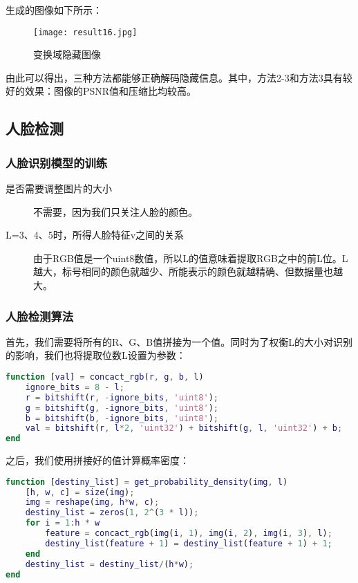 \documentclass[a4paper]{article}
\begin{document}
\par 生成的图像如下所示：

\begin{figure}[ht]
    \centering
    \texttt{[image: result16.jpg]}
    \caption{变换域隐藏图像}
    \label{fig:result 16}
\end{figure}

\par 由此可以得出，三种方法都能够正确解码隐藏信息。其中，方法2-3和方法3具有较好的效果：图像的PSNR值和压缩比均较高。

\subsection{人脸检测}

\subsubsection{人脸识别模型的训练}
\begin{description}
    \item [是否需要调整图片的大小]
    \par 不需要，因为我们只关注人脸的颜色。
    \item [L=3、4、5时，所得人脸特征v之间的关系]
    由于RGB值是一个uint8数值，所以L的值意味着提取RGB之中的前L位。L越大，标号相同的颜色就越少、所能表示的颜色就越精确、但数据量也越大。
    
\end{description}

\subsubsection{人脸检测算法}
\par 首先，我们需要将所有的R、G、B值拼接为一个值。同时为了权衡L的大小对识别的影响，我们也将提取位数L设置为参数：
\begin{lstlisting}[language=matlab, caption=RGB值的拼接]
function [val] = concact_rgb(r, g, b, l)    
    ignore_bits = 8 - l;
    r = bitshift(r, -ignore_bits, 'uint8');
    g = bitshift(g, -ignore_bits, 'uint8');
    b = bitshift(b, -ignore_bits, 'uint8');
    val = bitshift(r, l*2, 'uint32') + bitshift(g, l, 'uint32') + b;
end
\end{lstlisting}

\par 之后，我们使用拼接好的值计算概率密度：
\begin{lstlisting}[language=matlab, caption=概率密度计算]
function [destiny_list] = get_probability_density(img, l)
    [h, w, c] = size(img);
    img = reshape(img, h*w, c);
    destiny_list = zeros(1, 2^(3 * l));
    for i = 1:h * w
        feature = concact_rgb(img(i, 1), img(i, 2), img(i, 3), l); 
        destiny_list(feature + 1) = destiny_list(feature + 1) + 1;
    end
    destiny_list = destiny_list/(h*w);
end 
\end{lstlisting}
\end{document}
